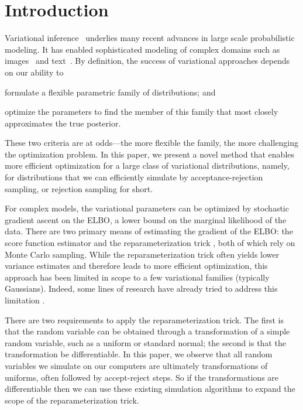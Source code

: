 
\section{Introduction}\label{sec:introduction}

Variational inference~\citep{hinton1993,Waterhouse96,Jordan1999}
underlies many recent advances in large scale probabilistic modeling.
It has enabled sophisticated modeling of complex domains such as
images~\citep{Kingma2014} and text~\citep{Hoffman2013}. By definition,
the success of variational approaches depends on our ability to
\begin{enumerate*}[label=(\roman*)]
\item formulate a flexible parametric family of distributions; and
\item optimize the parameters to find the member of this family that
  most closely approximates the true posterior.
\end{enumerate*}
These two criteria are at odds---the more flexible the family, the
more challenging the optimization problem.  In this paper, we present
a novel method that enables more efficient optimization for a large
class of variational distributions, namely, for distributions that we
can efficiently simulate by acceptance-rejection sampling, or rejection sampling for short.

For complex models, the variational parameters can be optimized
by stochastic gradient ascent on the \gls{ELBO}, a lower bound on the 
marginal likelihood of the data.
There are two primary means of estimating the gradient of the \gls{ELBO}:
the score function estimator \citep{Paisley2012,Ranganath2014,Mnih2014} and the
reparameterization trick \citep{Kingma2014,Rezende2014,Price1958, Bonnet1964}, both of which rely on Monte Carlo sampling.  While the
reparameterization trick often yields lower variance estimates and
therefore leads to more efficient optimization, this approach has been
limited in scope to a few variational families (typically Gaussians).
Indeed, some lines of research have already tried to address this 
limitation \citep{Knowles2015,RuizTB2016}.

There are two requirements to apply the reparameterization trick.  The
first is that the random variable can be obtained through a
transformation of a simple random variable, such as a uniform or
standard normal; the second is that the transformation be
differentiable.  In this paper, we observe that all random variables
we simulate on our computers are ultimately transformations of
uniforms, often followed by accept-reject steps.  So if the
transformations are differentiable then we can use these existing simulation
algorithms to expand the scope of the reparameterization trick.

